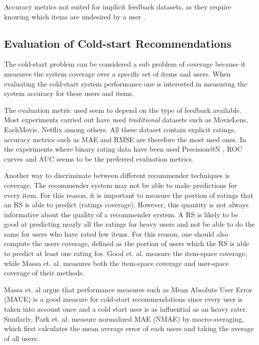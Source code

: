 Accuracy metrics not suited for implicit feedback datasets, as they require
knowing which items are undesired by a user \cite{Hu2008}.

\subsection{Evaluation of Cold-start Recommendations}

The cold-start problem can be considered a sub problem of coverage because it measures the system coverage over a specific set of items and users. When evaluating the cold-start system performance one is interested in measuring the system accuracy for these users and items.

The evaluation metric used seem to depend on the type of feedback available. Most experiments carried out have used \emph{traditional} datasets such as MovieLens, EachMovie, Netflix among others. All these dataset contain explicit ratings, accuracy metrics such as MAE \cite{Rashid2002, Rashid 2008, Massa2004, Massa2007, Stern2009} and RMSE \cite{Agarwal2009, Agarwal2010} are therefore the most used ones. In the experiments where binary rating data have been used Precision@N \cite{Liu2011, Ganter2010}, ROC curves \cite{Agarwal2009, Ganter2010, Schein2002} and AUC \cite{Liu2011, Ganter2010} seems to be the preferred evaluation metrics.

Another way to discriminate between different recommender techniques is coverage. The recommender system may not be able to make predictions for every item. For this reason, it is important to measure the portion of ratings that an RS is able to predict (ratings coverage). However, this quantity is not always informative about the quality of a recommender system. A RS is likely to be good at predicting nearly all the ratings for heavy users and not be able to do the same for users who have rated few items. For this reason, one should also compute the users coverage, defined as the portion of users which the RS is able to predict at least one rating for. Good et. al. \cite{Good1999} measure the item-space coverage, while Massa et. al. \cite{Massa2004, Massa2007} measures both the item-space coverage and user-space coverage of their methods.

Massa et. al \cite{Massa2004} argue that performance measures such as Mean Absolute User Error (MAUE) is a good measure for cold-start recommendations since every user is taken into account once and a cold start user is as influential as an heavy rater. Similarly, Park et. al. \cite{Park2006} measure normalized MAE (NMAE) by macro-averaging, which first calculates the mean average error of each users and taking the average of all users.

